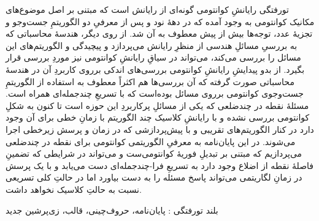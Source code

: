 


\pagestyle{empty}

‌تورفتگی
رایانشِ کوانتومی گونه‌ای از رایانش است که مبتنی بر اصل موضوع‌های مکانیک کوانتومی به وجود آمده 
که در دههٔ نود و پس از معرفیِ دو الگوریتمِ جست‌وجو و تجزیهٔ عدد، توجه‌ها بیش از پیش معطوف به آن شد.
از روی دیگر، هندسهٔ محاسباتی که به بررسیِ مسائلِ هندسی از منظرِ رایانش می‌پردازد و پیچیدگی و 
الگوریتم‌های این مسائل را بررسی می‌کند، می‌تواند در سیاقِ رایانشِ کوانتومی نیز موردِ بررسی قرار 
بگیرد. از بدو پیدایشِ رایانشِ کوانتومی بررسی‌های اندکی برروی کاربردِ آن در هندسهٔ محاسباتی صورت
گرفته که آن بررسی‌ها هم اکثراً معطوف به استفاده از الگوریتمِ جست‌وجوی کوانتومی برروی مسائل بوده‌است
که با تسریعِ چندجمله‌ای همراه است. مسئلهٔ نقطه در چندضلعی که یکی از مسائلِ پرکاربردِ این حوزه است
تا کنون به شکلِ کوانتومی بررسی نشده و با رایانشِ کلاسیک چند الگوریتم با زمانِ خطی برای آن وجود دارد
در کنار الگوریتم‌های تقریبی و با پیش‌پردازشی که در زمان و پرسش زیرخطی اجرا می‌شوند.
در این پایان‌نامه به معرفیِ الگوریتمی کوانتومی برای نقطه در چندضلعی می‌پردازیم که مبتنی بر تبدیلِ
فوریهٔ کوانتومی‌ست و می‌تواند در  شرایطی که تضمینِ فاصلهٔ نقطه از اضلاع وجود دارد به تسریعِ
فرا-چندجمله‌ای دست می‌یابد و با یک پرسش در زمانِ لگاریتمی می‌تواند پاسخ مسئله را به دست بیاورد
اما در حالتِ کلی تسریعی نسبت به حالتِ کلاسیک نخواهد داشت.

‌بلند
‌تورفتگی : 
پایان‌نامه، حروف‌چینی، قالب، زی‌پرشین
‌جدید

